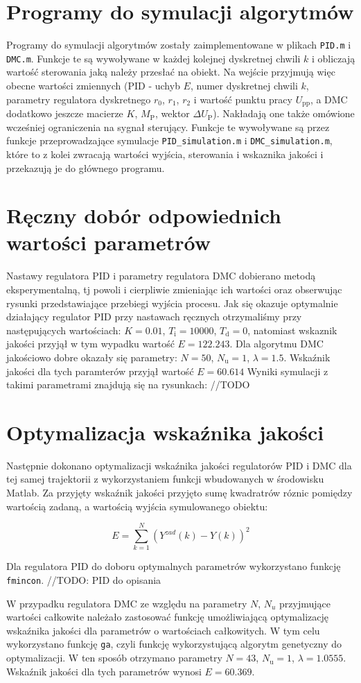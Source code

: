 \section{Programy do symulacji algorytmów}
Programy do symulacji algorytmów zostały zaimplementowane w plikach \texttt{PID.m} i \texttt{DMC.m}. Funkcje te są wywoływane w każdej kolejnej dyskretnej chwili $k$ i obliczają wartość sterowania jaką należy przesłać na obiekt. Na wejście przyjmują więc obecne wartości zmiennych (PID - uchyb $E$, numer dyskretnej chwili $k$, parametry regulatora dyskretnego $r_{\mathrm{0}}$, $r_{\mathrm{1}}$, $r_{\mathrm{2}}$ i wartość punktu pracy $U_{\mathrm{pp}}$, a DMC dodatkowo jeszcze macierze $K$, $M_{\mathrm{P}}$, wektor $\Delta U_{\mathrm{P}}$). Nakładają one także omówione wcześniej ograniczenia na sygnał sterujący. Funkcje te wywoływane są przez funkcje przeprowadzające symulacje \texttt{PID\_simulation.m} i \texttt{DMC\_simulation.m}, które to z kolei zwracają wartości wyjścia, sterowania i wskaznika jakości i przekazują je do głównego programu.

\section{Ręczny dobór odpowiednich wartości parametrów}
Nastawy regulatora PID i parametry regulatora DMC dobierano metodą eksperymentalną, tj powoli i cierpliwie zmieniając ich wartości oraz obserwując rysunki przedstawiające przebiegi wyjścia procesu. Jak się okazuje optymalnie działający regulator PID przy nastawach ręcznych otrzymaliśmy przy następujących wartościach: $K=\num{0.01}$, $T_\mathrm{i}=10000$, $T_\mathrm{d}=0$, natomiast wskaznik jakości przyjął w tym wypadku wartość $E=\num{122.243}$. Dla algorytmu DMC jakościowo dobre okazały się parametry: $N=50$, $N_\mathrm{u}=1$, $\lambda=\num{1.5}$. Wskaźnik jakości dla tych paramterów przyjął wartość $E=\num{60.614}$  Wyniki symulacji z takimi parametrami znajdują się na rysunkach: //TODO
\section{Optymalizacja wskaźnika jakości}
Następnie dokonano optymalizacji wskaźnika jakości regulatorów PID i DMC dla tej samej trajektorii z wykorzystaniem funkcji wbudowanych w środowisku Matlab. Za przyjęty wskaźnik jakości przyjęto sumę kwadratrów róznic pomiędzy wartością zadaną, a wartością wyjścia symulowanego obiektu:

\begin{equation}
E = \sum_{k=1}^{N} (Y^{zad}(k)-Y(k))^2
\end{equation}

Dla regulatora PID do doboru optymalnych parametrów wykorzystano funkcję 
\verb+fmincon+. //TODO: PID do opisania

W przypadku regulatora DMC ze względu na parametry $N$, $N_u$ przyjmujące wartości całkowite należało zastosować funkcję umożliwiającą optymalizację wskaźnika jakości dla parametrów o wartościach całkowitych. W tym celu wykorzystano funkcję \verb+ga+, czyli funkcję wykorzystującą algorytm genetyczny do optymalizacji. W ten sposób otrzymano parametry $N=43$, $N_\mathrm{u}=1$, $\lambda=\num{1.0555}$. Wskaźnik jakości dla tych parametrów wynosi $E=\num{60.369}$.